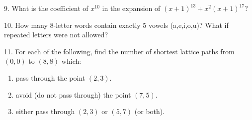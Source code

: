 \documentclass[10pt,]{book}
\theoremstyle{plain}
\theoremstyle{definition}
\theoremstyle{definition}
\theoremstyle{definition}
\numberwithin{equation}{chapter}
\begin{document}
\begin{exerciselist}
\par\smallskip
\item[9.]\hypertarget{exercise-110}{}
            What is the coefficient of \(x^{10}\) in the expansion of \((x+1)^{13} + x^2(x+1)^{17}\)?
\par\smallskip
\item[10.]\hypertarget{exercise-111}{}
            How many 8-letter words contain exactly 5 vowels (a,e,i,o,u)? What if repeated letters were not allowed?
\par\smallskip
\item[11.]\hypertarget{exercise-112}{}
            For each of the following, find the number of shortest lattice paths from \((0,0)\) to \((8,8)\) which:
          \leavevmode%
\begin{enumerate}[label=(\alph*)]
\item\hypertarget{li-741}{}
                pass through the point \((2,3)\).
\item\hypertarget{li-742}{}
                avoid (do not pass through) the point \((7,5)\).
\item\hypertarget{li-743}{}
                either pass through \((2,3)\) or \((5,7)\) (or both).
\end{enumerate}


\end{exerciselist}
\end{document}
